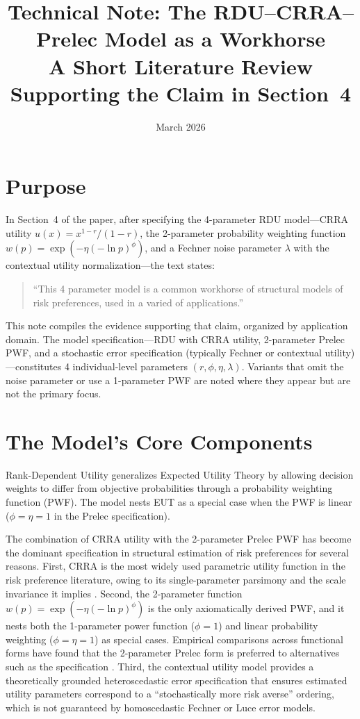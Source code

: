 \documentclass[12pt,a4paper]{article}
\title{Technical Note: The RDU--CRRA--Prelec Model as a Workhorse\\[6pt]
\large A Short Literature Review Supporting the Claim in Section~4}
\author{}
\date{March 2026}
\begin{document}
\maketitle
\thispagestyle{empty}

\section{Purpose}

In Section~4 of the paper, after specifying the 4-parameter RDU model---CRRA
utility $u(x) = x^{1-r}/(1-r)$, the 2-parameter \textcite{Prelec1998}
probability weighting function $w(p) = \exp(-\eta(-\ln p)^\phi)$, and a Fechner
noise parameter $\lambda$ with the \textcite{Wilcox2011} contextual utility
normalization---the text states:

\begin{quote}
``This 4 parameter model is a common workhorse of structural models of risk
preferences, used in a varied of applications.''
\end{quote}

This note compiles the evidence supporting that claim, organized by application
domain. The model specification---RDU with CRRA utility, 2-parameter Prelec
PWF, and a stochastic error specification (typically Fechner or contextual
utility)---constitutes 4 individual-level parameters $(r, \phi, \eta, \lambda)$.
Variants that omit the noise parameter or use a 1-parameter PWF are noted where
they appear but are not the primary focus.

\section{The Model's Core Components}

Rank-Dependent Utility \parencite{Quiggin1982} generalizes Expected Utility
Theory by allowing decision weights to differ from objective probabilities
through a probability weighting function (PWF). The model nests EUT as a
special case when the PWF is linear ($\phi = \eta = 1$ in the Prelec
specification).

The combination of CRRA utility with the 2-parameter Prelec PWF has become the
dominant specification in structural estimation of risk preferences for several
reasons. First, CRRA is the most widely used parametric utility function in the
risk preference literature, owing to its single-parameter parsimony and the
scale invariance it implies \parencite{HarrisonRutstrom2008}. Second, the
\textcite{Prelec1998} 2-parameter function
$w(p) = \exp(-\eta(-\ln p)^\phi)$ is the only axiomatically derived PWF, and
it nests both the 1-parameter power function ($\phi = 1$) and linear
probability weighting ($\phi = \eta = 1$) as special cases. Empirical
comparisons across functional forms have found that the 2-parameter Prelec form
is preferred to alternatives such as the \textcite{TverskyKahneman1992}
specification \parencite{Stott2006, HarrisonSwarthout2023}. Third, the
\textcite{Wilcox2011} contextual utility model provides a theoretically
grounded heteroscedastic error specification that ensures estimated utility
parameters correspond to a ``stochastically more risk averse'' ordering, which
is not guaranteed by homoscedastic Fechner or Luce error models.
\end{document}
